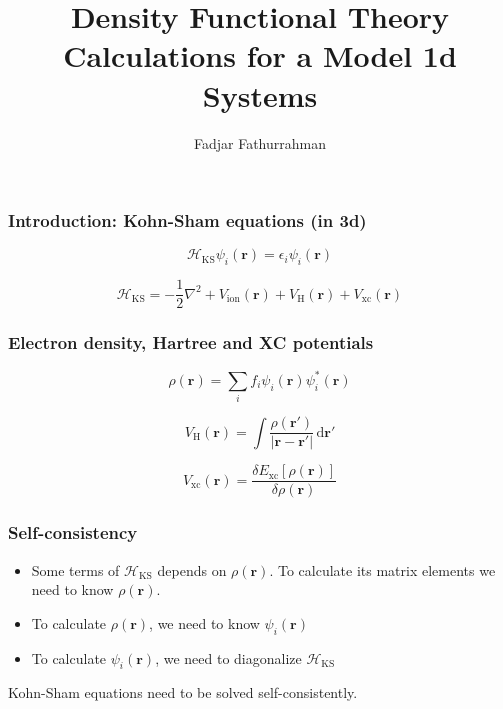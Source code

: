 



\title{Density Functional Theory Calculations for a Model 1d Systems}
\author{Fadjar Fathurrahman}
\date{}


\frame{\titlepage}


\begin{frame}
\frametitle{Introduction: Kohn-Sham equations (in 3d)}

\begin{equation*}
\mathcal{H}_{\mathrm{KS}} \psi_{i}(\mathbf{r}) = \epsilon_{i} \psi_{i}(\mathbf{r})
\end{equation*}

\begin{equation*}
\mathcal{H}_{\mathrm{KS}} =
-\frac{1}{2} \nabla^2 +
V_{\mathrm{ion}}(\mathbf{r}) +
V_{\mathrm{H}}(\mathbf{r}) + V_{\mathrm{xc}}(\mathbf{r})
\end{equation*}

\end{frame}


\begin{frame}
\frametitle{Electron density, Hartree and XC potentials}

\begin{equation*}
\rho(\mathbf{r}) = \sum_{i} f_{i} \psi_{i}(\mathbf{r}) \psi^{*}_{i}(\mathbf{r}) 
\end{equation*}

\begin{equation*}
V_{\mathrm{H}}(\mathbf{r}) = \int \frac{\rho(\mathbf{r}')}{\left| \mathbf{r} - \mathbf{r}' \right|}
\,\mathrm{d}\mathbf{r}'
\end{equation*}

\begin{equation*}
V_{\mathrm{xc}}(\mathbf{r}) = \frac{\delta E_{\mathrm{xc}}[\rho(\mathbf{r})]}%
{\delta \rho(\mathbf{r})}
\end{equation*}

\end{frame}



\begin{frame}
\frametitle{Self-consistency}

\begin{itemize}
\item Some terms of $\mathcal{H}_{\mathrm{KS}}$ depends on $\rho(\mathbf{r})$.
To calculate its matrix elements we need to know $\rho(\mathbf{r})$.
\item To calculate $\rho(\mathbf{r})$, we need to know $\psi_{i}(\mathbf{r})$
\item To calculate $\psi_{i}(\mathbf{r})$, we need to diagonalize $\mathcal{H}_{\mathrm{KS}}$
\end{itemize}

Kohn-Sham equations need to be solved self-consistently.

\end{frame}


